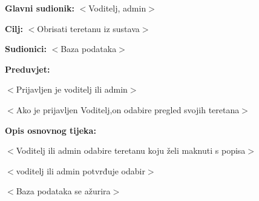 					\noindent {}
					\begin{packed_item}
	
						\item \textbf{Glavni sudionik: } $<$Voditelj, admin$>$
						\item  \textbf{Cilj:} $<$Obrisati teretanu iz sustava$>$
						\item  \textbf{Sudionici:} $<$Baza podataka$>$
						\item  \textbf{Preduvjet:}
						\item[] \begin{packed_enum}
	
							\item $<$Prijavljen je voditelj ili admin$>$
							\item $<$Ako je prijavljen Voditelj,on odabire pregled svojih teretana$>$

						\end{packed_enum}
						\item  \textbf{Opis osnovnog tijeka:}
						
						\item[] \begin{packed_enum}
	
							\item $<$Voditelj ili admin odabire teretanu koju želi maknuti s popisa$>$
							\item $<$voditelj ili admin potvrđuje odabir$>$
							\item $<$Baza podataka se ažurira$>$
						\end{packed_enum}
						
					\end{packed_item}
					
